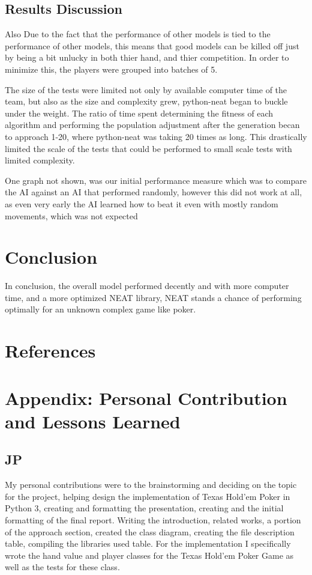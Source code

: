 \subsection{Results Discussion}
Also Due to the fact that the performance of other models is tied to the performance of other models, this
means that good models can be killed off just by being a bit unlucky in both thier hand, and thier competition.
In order to minimize this, the players were grouped into batches of 5.

The size of the tests were limited not only by available computer time of the team, but also as the size and
complexity grew, python-neat began to buckle under the weight. The ratio of time spent determining the fitness
of each algorithm and performing the population adjustment after the generation becan to approach 1-20, where
python-neat was taking 20 times as long. This drastically limited the scale of the tests that could be performed
to small scale tests with limited complexity.

One graph not shown, was our initial performance measure which was to compare the AI against an AI that
performed randomly, however this did not work at all, as even very early the AI learned how to beat it even
with mostly random movements, which was not expected

\section{Conclusion}
In conclusion, the overall model performed decently and with more computer time, and a more optimized
NEAT library, NEAT stands a chance of performing optimally for an unknown complex game like poker. 



\section{References}
\printbibliography

\section{Appendix: Personal Contribution and Lessons Learned}
\subsection{JP}
My personal contributions were to the brainstorming and deciding on the topic for the project, helping design the implementation of Texas Hold'em Poker in Python 3, creating and formatting the presentation, creating and the initial formatting of the final report. Writing the introduction, related works, a portion of the approach section, created the class diagram, creating the file description table, compiling the libraries used table. For the implementation I specifically wrote the hand value and player classes for the Texas Hold'em Poker Game as well as the tests for these class.

